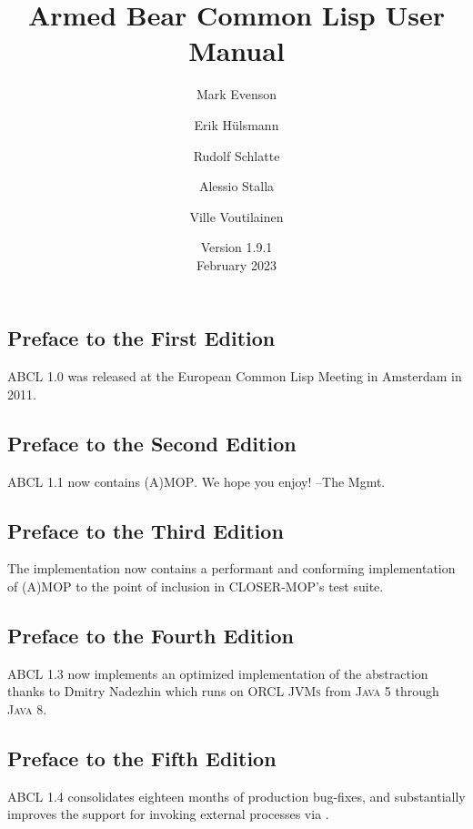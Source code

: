 \documentclass[10pt]{book}
\begin{document}
\title{Armed Bear Common Lisp User Manual}
\date{Version 1.9.1\\
\smallskip
February 2023}
\author{Mark Evenson \and Erik H\"{u}lsmann \and Rudolf Schlatte \and
  Alessio Stalla \and Ville Voutilainen}

\maketitle

\tableofcontents

\subsection{Preface to the First Edition}
\textsc{ABCL} 1.0 was released at the European Common Lisp Meeting
in Amsterdam in 2011.

\subsection{Preface to the Second Edition}
\textsc{ABCL} 1.1 now contains \textsc{(A)MOP}.  We hope you enjoy!
--The Mgmt.

\subsection{Preface to the Third Edition}
The implementation now contains a performant and conforming
implementation of \textsc{(A)MOP} to the point of inclusion in
\textsc{CLOSER-MOP}'s test suite.

\subsection{Preface to the Fourth Edition}

\textsc{ABCL} 1.3 now implements an optimized implementation of the
 abstraction thanks to Dmitry
Nadezhin which runs on ORCL \textsc{JVMs} from \textsc{Java 5} through
\textsc{Java 8}.

\subsection{Preface to the Fifth Edition}

\textsc{ABCL} 1.4 consolidates eighteen months of production bug-fixes,
and substantially improves the support for invoking external
processes via .
\end{document}
